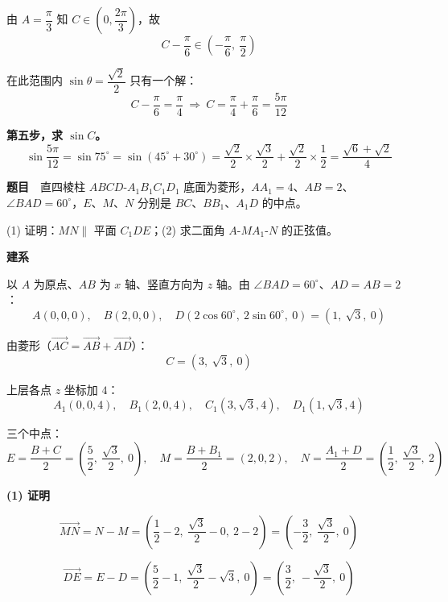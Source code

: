 由 $A=\dfrac\pi3$ 知 $C\in\left(0,\dfrac{2\pi}3\right)$，故
\[C-\frac\pi6\in\left(-\frac\pi6,\ \frac\pi2\right)\]

在此范围内 $\sin\theta=\dfrac{\sqrt2}2$ 只有一个解：
\[C-\frac\pi6=\frac\pi4\ \Longrightarrow\ C=\frac\pi4+\frac\pi6=\frac{5\pi}{12}\]

\textbf{第五步，求 $\sin C$。}
\[\sin\frac{5\pi}{12}=\sin75^\circ=\sin\left(45^\circ+30^\circ\right)=\frac{\sqrt2}2\times\frac{\sqrt3}2+\frac{\sqrt2}2\times\frac12=\frac{\sqrt6+\sqrt2}4\]


\par\medskip


\textbf{题目}　直四棱柱 $ABCD\text{-}A_1B_1C_1D_1$ 底面为菱形，$AA_1=4$、$AB=2$、$\angle BAD=60^\circ$，$E$、$M$、$N$ 分别是 $BC$、$BB_1$、$A_1D$ 的中点。

\begin{center}\end{center}

  (1) 证明：$MN\parallel$ 平面 $C_1DE$；(2) 求二面角 $A\text{-}MA_1\text{-}N$ 的正弦值。

\par\medskip

\textbf{建系}

以 $A$ 为原点、$AB$ 为 $x$ 轴、竖直方向为 $z$ 轴。由 $\angle BAD=60^\circ$、$AD=AB=2$：
\[A(0,0,0),\quad B(2,0,0),\quad D\left(2\cos60^\circ,\ 2\sin60^\circ,\ 0\right)=\left(1,\ \sqrt3,\ 0\right)\]

由菱形（$\overrightarrow{AC}=\overrightarrow{AB}+\overrightarrow{AD}$）：
\[C=\left(3,\ \sqrt3,\ 0\right)\]

上层各点 $z$ 坐标加 $4$：
\[A_1(0,0,4),\quad B_1(2,0,4),\quad C_1\left(3,\sqrt3,4\right),\quad D_1\left(1,\sqrt3,4\right)\]

三个中点：
\[E=\frac{B+C}2=\left(\frac52,\ \frac{\sqrt3}2,\ 0\right),\quad M=\frac{B+B_1}2=(2,0,2),\quad N=\frac{A_1+D}2=\left(\frac12,\ \frac{\sqrt3}2,\ 2\right)\]

\par\medskip

\textbf{(1) 证明}

\[\overrightarrow{MN}=N-M=\left(\frac12-2,\ \frac{\sqrt3}2-0,\ 2-2\right)=\left(-\frac32,\ \frac{\sqrt3}2,\ 0\right)\]

\[\overrightarrow{DE}=E-D=\left(\frac52-1,\ \frac{\sqrt3}2-\sqrt3,\ 0\right)=\left(\frac32,\ -\frac{\sqrt3}2,\ 0\right)\]


